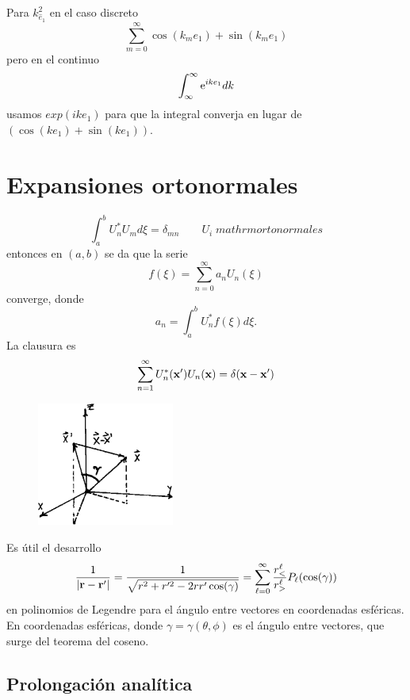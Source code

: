 \documentclass[10pt,oneside]{CBFT_book}
\begin{document}
Para $k_{\hat{e}_1}^2$ en el caso discreto
\[
	\sum_{m=0}^\infty \cos(k_m e_1) + \sin(k_m e_1)
\]
pero en el continuo 
\[
	\int_{\infty}^{\infty} \mathrm{e}^{ike_1} dk
\]
usamos $exp(ike_1)$ para que la integral converja en lugar de $(\cos(ke_1) + \sin(ke_1))$.

\section{Expansiones ortonormales}

\[
	\int_a^b U^*_n U_m d\xi = \delta_{mn} \qquad U_i \; mathrm{ortonormales}
\]
entonces en $(a,b)$ se da que la serie 
\[
	f(\xi) = \sum_{n=0}^\infty a_n U_n(\xi) 
\]
converge, donde  
\[
	a_n = \int_a^b U^*_n f(\xi) d\xi.
\]
La clausura es
\[
	\sum_{n=1}^\infty U^*_n(\vb{x}') U_n(\vb{x}) = \delta(\vb{x}-\vb{x}')
\]

\begin{figure}[thb]
	\begin{center}
	\includegraphics[width=0.4\textwidth]{images/fig_ft1_expansiones1.pdf}	 
	\end{center}
	\caption{}
\end{figure} 

Es útil el desarrollo
\[
	\frac{1}{|\vb{r} - \vb{r}'|} = \frac{1}{\sqrt{r^2 + r'^2 -2rr'\cos(\gamma)}}
	= \sum_{\ell=0}^\infty \frac{r^\ell_{<}}{r^\ell_{>}} P_\ell (\cos(\gamma))
\]
en polinomios de Legendre para el ángulo entre vectores en coordenadas esféricas.
En coordenadas esféricas, donde $\gamma=\gamma(\theta,\phi)$ es el ángulo entre vectores,
que surge del teorema del coseno.

\subsection{Prolongación analítica}
\end{document}
